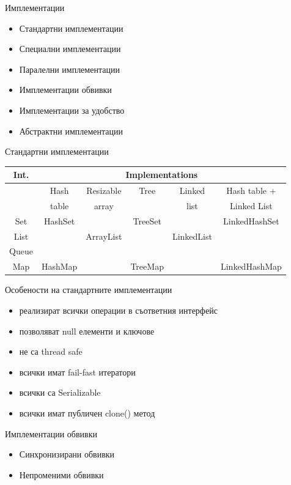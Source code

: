 \documentclass{beamer}
\begin{document}
\begin{frame}{Имплементации}
  \transdissolve
  \begin{itemize}
  \item Стандартни имплементации
  \item Специални имплементации
  \item Паралелни имплементации
  \item Имплементации обвивки
  \item Имплементации за удобство
  \item Абстрактни имплементации
  \end{itemize}
\end{frame}


\begin{frame}{Стандартни имплементации}
  \transdissolve
  \small
  \begin{tabular}{|c|c|c|c|c|c|}
    \hline
    Int. & \multicolumn{5}{|c|}{Implementations}  \\
    \hline
    \hline
    & Hash & Resizable & Tree & Linked & Hash table + \\
    & table & array & & list & Linked List \\
    \hline
    Set & HashSet & & TreeSet & & LinkedHashSet \\
    \hline
    List & & ArrayList & & LinkedList \\
    \hline
    Queue & & & & & \\
    \hline
    Map & HashMap & & TreeMap & & LinkedHashMap \\
    \hline
  \end{tabular}

\end{frame}

\begin{frame}{Особености на стандартните имплементации}
\transdissolve
\begin{itemize}
\item реализират всички операции в съответния интерфейс
\item позволяват null елементи и ключове
\item не са thread safe
\item всички имат fail-fast итератори
\item всички са Serializable
\item всички имат публичен clone() метод
\end{itemize}
\end{frame}

\begin{frame}{Имплементации обвивки}
  \transdissolve
  \begin{itemize}
  \item Синхронизирани обвивки
  \item Непроменими обвивки
  \end{itemize}
\end{frame}
\end{document}
